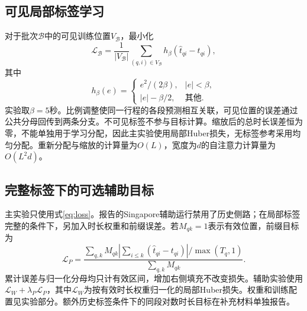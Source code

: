 \subsection{可见局部标签学习}
对于批次$\mathcal B$中的可见训练位置$V_{\mathcal B}$，最小化
\begin{equation}
\mathcal L_{\mathcal B}=\frac1{|V_{\mathcal B}|}
\sum_{(q,i)\in V_{\mathcal B}}h_\beta(\hat t_{qi}-t_{qi}),
\label{eq:loss}
\end{equation}
其中
\begin{equation}
h_\beta(e)=\begin{cases}
e^2/(2\beta),&|e|<\beta,\\
|e|-\beta/2,&\text{其他}.
\end{cases}
\end{equation}
实验取$\beta=5$秒。比例调整使同一行程的各段预测相互关联，可见位置的误差通过公共分母回传到两条分支。不可见标签不参与目标计算。缩放后的总时长误差恒为零，不能单独用于学习分配，因此主实验使用局部Huber损失，无标签参考采用均匀分配。重新分配与缩放的计算量为$O(L)$，宽度为$d$的自注意力计算量为$O(L^2d)$。

\subsection{完整标签下的可选辅助目标}
主实验只使用式\eqref{eq:loss}。报告的Singapore辅助运行禁用了历史侧路；在局部标签完整的条件下，另加入时长权重和前缀误差。若$M_{qk}=1$表示有效位置，前缀目标为
\begin{equation}
\mathcal L_P=\frac{\sum_{q,k}M_{qk}\left|\sum_{i\leq k}(\hat t_{qi}-t_{qi})\right|/\max(T_q,1)}{\sum_{q,k}M_{qk}}.
\label{eq:prefix}
\end{equation}
累计误差与归一化分母均只计有效区间，增加右侧填充不改变损失。辅助实验使用$\mathcal L_W+\lambda_P\mathcal L_P$，其中$\mathcal L_W$为按有效时长权重归一化的局部Huber损失。权重和训练配置见实验部分。额外历史标签条件下的同段对数时长目标在补充材料单独报告。

